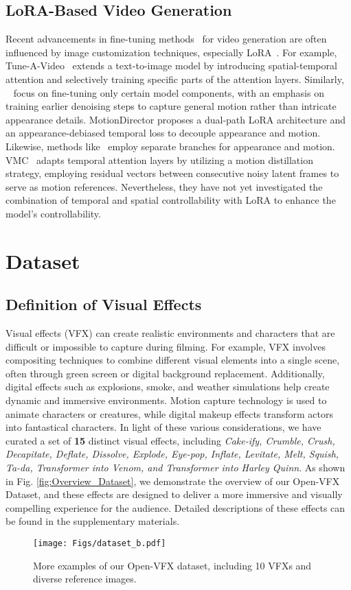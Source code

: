 \subsection{LoRA-Based Video Generation}
Recent advancements in fine-tuning methods~\cite{wu2024motionbooth,wu2024customcrafter,wang2024customvideo,guo2023animatediff,wang2024motionctrl,ouyang2024i2vedit} for video generation are often influenced by image customization techniques, especially LoRA~\cite{hu2021lora}. For example, Tune-A-Video~\cite{wu2023tune} extends a text-to-image model by introducing spatial-temporal attention and selectively training specific parts of the attention layers. Similarly, ~\cite{materzynska2023customizing} focus on fine-tuning only certain model components, with an emphasis on training earlier denoising steps to capture general motion rather than intricate appearance details. MotionDirector\cite{zhao2025motiondirector} proposes a dual-path LoRA architecture and an appearance-debiased temporal loss to decouple appearance and motion. Likewise, methods like~\cite{wei2024dreamvideo, zhang2023motioncrafter, ren2024customize} employ separate branches for appearance and motion. VMC~\cite{jeong2024vmc} adapts temporal attention layers by utilizing a motion distillation strategy, employing residual vectors between consecutive noisy latent frames to serve as motion references. Nevertheless, they have not yet investigated the combination of temporal and spatial controllability with LoRA to enhance the model's controllability.
\section{Dataset}
\subsection{Definition of Visual Effects}
Visual effects (VFX) can create realistic environments and characters that are difficult or impossible to capture during filming. For example, VFX involves compositing techniques to combine different visual elements into a single scene, often through green screen or digital background replacement. Additionally, digital effects such as explosions, smoke, and weather simulations help create dynamic and immersive environments. Motion capture technology is used to animate characters or creatures, while digital makeup effects transform actors into fantastical characters. In light of these various considerations, we have curated a set of \textbf{15} distinct visual effects, including \emph{Cake-ify, Crumble, Crush, Decapitate, Deflate, Dissolve, Explode, Eye-pop, Inflate, Levitate, Melt, Squish, Ta-da, Transformer into Venom, and Transformer into Harley Quinn}. As shown in Fig. \ref{fig:Overview_Dataset}, we demonstrate the overview of our Open-VFX Dataset, and these effects are designed to deliver a more immersive and visually compelling experience for the audience. Detailed descriptions of these effects can be found in the supplementary materials.
\begin{figure*}
    \centering
    \texttt{[image: Figs/dataset\_b.pdf]}  %
    \caption{More examples of our Open-VFX dataset, including 10 VFXs and diverse reference images.}
    \label{fig:dataset}
\end{figure*}
